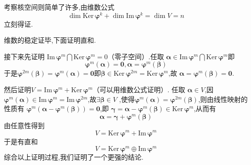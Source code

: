 \begin{brown}
\begin{Proof}
    考察核空间则简单了许多,由维数公式
    \[
    \dim \mathrm{Ker}\,\bm{\varphi}^k + \dim 
    \mathrm{Im}\,\bm{\varphi}^k = \dim V =n
    \]
    立刻得证.
    
    维数的稳定证毕,下面证明直和.

    接下来先证明
    $\mathrm{Im}\,\bm{\varphi}^m
    \bigcap \mathrm{Ker}\,\bm{\varphi}^m = 0$（零子空间）.任取
    $\bm{\alpha}\in \mathrm{Im}\,\bm{\varphi}^m\bigcap \mathrm{Ker}\,\bm{\varphi}^m$即
    \[
    \bm{\varphi}^m\left(\bm{\alpha}\right)=\bm{0},
    \bm{\alpha}=\bm{\varphi}^m\left(\bm{\beta}\right)
    \]
    于是$\bm{\varphi}^{2m}\left(\bm{\beta}\right)=
    \bm{\varphi}^m\left(\bm{\alpha}\right)=\bm{0}$即$\bm{\beta}\in 
    \mathrm{Ker}\,\bm{\varphi}^{2m}=\mathrm{Ker}\,\bm{\varphi}^m$,故
    $\bm{\alpha}=\bm{\varphi}^m\left(\bm{\beta}\right)=\bm{0}$.

    然后证明$V=\mathrm{Im}\,\bm{\varphi}^m + \mathrm{Ker}\,\bm{\varphi}^m$（可以用维数公式证明）.
    任取
    $\bm{\alpha}\in V$,因$\bm{\varphi}^m\left(
        \bm{\alpha}
    \right)\in \mathrm{Im}\,
    \bm{\varphi}^m=\mathrm{Im}\,
    \bm{\varphi}^{2m}$,故$\exists \bm{\beta}\in V$
    ,使得$\bm{\varphi}^{m}\left(\bm{\alpha}
    \right)=\bm{\varphi}^{2m}\left(\bm{\beta}
    \right)$,则由线性映射的性质有
    $\bm{\varphi}^m\left(\bm{\alpha}-\bm{\varphi}^m\left(\bm{\beta}
    \right)\right)=\bm{0}$,即
    $\bm{\gamma}=\bm{\alpha}-\bm{\varphi}^m\left(\bm{\beta}\right)\in \mathrm{Ker}\,\bm{\varphi}^m$,从而有
    \[
    \bm{\alpha}=\bm{\gamma}+\bm{\varphi}^m\left(\bm{\beta}\right)
    \]
    由任意性得到
    \[
    V=\mathrm{Ker}\,\bm{\varphi}^m+\mathrm{Im}\,\bm{\varphi}^m
    \]
    于是有直和
    \[
    V=\mathrm{Ker}\,\bm{\varphi}^m\oplus\mathrm{Im}\,\bm{\varphi}^m
    \]
    综合以上证明过程,我们证明了一个更强的结论.
\end{Proof}
\end{brown}
